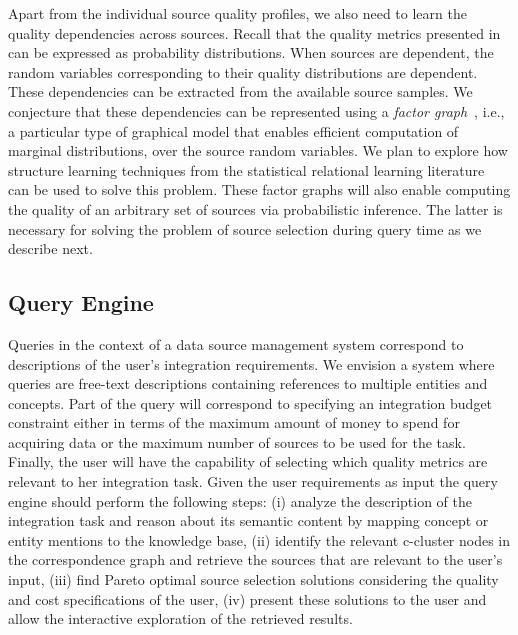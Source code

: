 \documentclass{sig-alternate}
\begin{document}
Apart from the individual source quality profiles, we also need to learn the quality dependencies across sources. Recall that the quality metrics presented in  
can be expressed as probability distributions. When sources are dependent, the random variables corresponding to their quality distributions are dependent. These dependencies can be extracted from the available source samples.  We conjecture that these dependencies can be represented using a {\em factor graph}~\cite{koller:2009}, i.e., a particular type of graphical model that enables efficient computation of marginal distributions, over the source random variables. We plan to explore how structure learning techniques from the statistical relational learning literature~\cite{getoor:2007} can be used to solve this problem. These factor graphs will also enable computing the quality of an arbitrary set of sources via probabilistic inference. The latter is necessary for solving the problem of source selection during query time as we describe next. 

\subsection{Query Engine}
\label{sec:queryengine}
Queries in the context of a data source management system correspond to descriptions of the user's integration requirements. We envision a system where queries are free-text descriptions containing references to multiple entities and concepts. Part of the query will correspond to specifying an integration budget constraint either in terms of the maximum amount of money to spend for acquiring data or the maximum number of sources to be used for the task. Finally, the user will have the capability of selecting which quality metrics are relevant to her integration task. Given the user requirements as input the query engine should perform the following steps: (i) analyze the description of the integration task and reason about its semantic content by mapping concept or entity mentions to the knowledge base, (ii) identify the relevant c-cluster nodes in the correspondence graph and retrieve the sources that are relevant to the user's input, (iii) find Pareto optimal source selection solutions considering the quality and cost specifications of the user, (iv) present these solutions to the user and allow the interactive exploration of the retrieved results.
\end{document}
